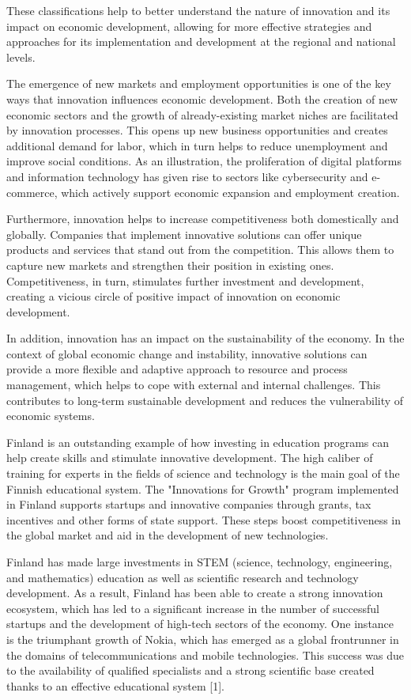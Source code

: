 These classifications help to better understand the nature of innovation
and its impact on economic development, allowing for more effective
strategies and approaches for its implementation and development at the
regional and national levels.

The emergence of new markets and employment opportunities is one of the
key ways that innovation influences economic development. Both the
creation of new economic sectors and the growth of already-existing
market niches are facilitated by innovation processes. This opens up new
business opportunities and creates additional demand for labor, which in
turn helps to reduce unemployment and improve social conditions. As an
illustration, the proliferation of digital platforms and information
technology has given rise to sectors like cybersecurity and e-commerce,
which actively support economic expansion and employment creation.

Furthermore, innovation helps to increase competitiveness both
domestically and globally. Companies that implement innovative solutions
can offer unique products and services that stand out from the
competition. This allows them to capture new markets and strengthen
their position in existing ones. Competitiveness, in turn, stimulates
further investment and development, creating a vicious circle of
positive impact of innovation on economic development.

In addition, innovation has an impact on the sustainability of the
economy. In the context of global economic change and instability,
innovative solutions can provide a more flexible and adaptive approach
to resource and process management, which helps to cope with external
and internal challenges. This contributes to long-term sustainable
development and reduces the vulnerability of economic systems.

Finland is an outstanding example of how investing in education programs
can help create skills and stimulate innovative development. The high
caliber of training for experts in the fields of science and technology
is the main goal of the Finnish educational system. The "Innovations for
Growth" program implemented in Finland supports startups and innovative
companies through grants, tax incentives and other forms of state
support. These steps boost competitiveness in the global market and aid
in the development of new technologies.

Finland has made large investments in STEM (science, technology,
engineering, and mathematics) education as well as scientific research
and technology development. As a result, Finland has been able to create
a strong innovation ecosystem, which has led to a significant increase
in the number of successful startups and the development of high-tech
sectors of the economy. One instance is the triumphant growth of Nokia,
which has emerged as a global frontrunner in the domains of
telecommunications and mobile technologies. This success was due to the
availability of qualified specialists and a strong scientific base
created thanks to an effective educational system {[}1{]}.

